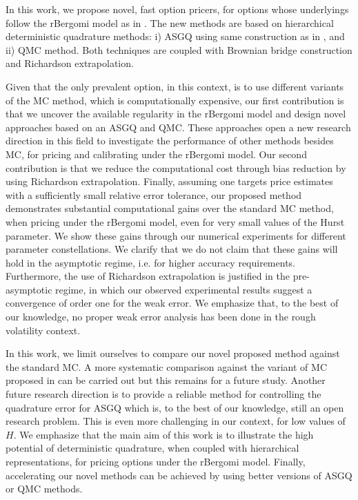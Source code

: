 In this work,  we propose  novel, fast option pricers,  for options whose underlyings  follow the rBergomi model as in \cite{bayer2016pricing}.  The new methods  are based on hierarchical deterministic quadrature methods:  i) ASGQ using  same construction as in \cite{haji2016multi}, and ii)  QMC method. Both techniques are coupled with Brownian bridge construction and Richardson extrapolation.

Given that the only prevalent option, in this context, is to use different variants of the MC method, which is computationally expensive, our first contribution  is that we uncover the available regularity in the rBergomi model and  design novel  approaches based on an ASGQ and QMC. These approaches  open a new research direction in this field to investigate the performance of other methods besides MC, for pricing and calibrating under the rBergomi model. Our second contribution is that we reduce the computational cost  through bias reduction by using Richardson extrapolation. Finally, assuming one targets price estimates with a sufficiently small relative error tolerance, our proposed method demonstrates substantial computational gains  over the standard MC method, when pricing under the rBergomi model, even for very small values of the Hurst parameter. We show  these gains through our numerical experiments for  different parameter constellations.  We clarify that we do not claim that these gains will hold in the asymptotic regime, i.e.\red{,}  for higher accuracy requirements. Furthermore, the use of Richardson extrapolation is justified in the pre-asymptotic regime, in which our observed experimental results suggest a convergence of order one for the weak error. We emphasize that, to the best of our knowledge, no proper weak error analysis has been done in the rough volatility context. 

In this work, we limit ourselves to compare our novel proposed method against the standard MC. A more systematic comparison against the variant of MC proposed in \cite{mccrickerd2018turbocharging}  can be carried out but this remains for a future study. Another future research direction is to provide a reliable method for controlling the quadrature error for ASGQ which is,  to the best of our knowledge,  still  an open research problem. This is even more challenging in our context,  for low values of $H$. We emphasize that the main aim of this work is to illustrate the high potential of deterministic quadrature, when coupled with hierarchical representations, for pricing options under the rBergomi model.   Finally, accelerating  our novel  methods can be achieved  by using better versions of  ASGQ or QMC methods.
